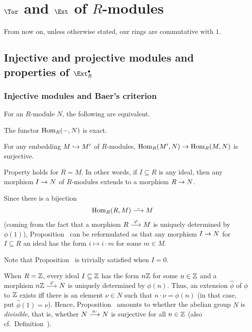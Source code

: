 \documentclass[a4paper,parskip=half,numbers=enddot, DIV=12]{scrreprt}
\begin{document}
\chapter{\texorpdfstring{$\Tor$}{Tor} and \texorpdfstring{$\Ext$}{Ext} of \texorpdfstring{$R$}{R}-modules}
From now on, unless otherwise stated, our rings are commutative with $1$.
\section{Injective and projective modules and properties of \texorpdfstring{$\Ext_R^\bullet $}{Ext}}
\subsection{Injective modules and Baer's criterion}
\begin{prop}
	For an $R$-module $N$, the following are equivalent.
	\begin{alphanumerate}
		\item The functor $\operatorname{Hom}_R(-,N)$ is exact.
		\item For any embedding $M\monomorphism M'$ of $R$-modules, $\Hom_R(M',N)\morphism\Hom_R(M,N)$ is surjective.
		\item Property  holds for $R=M$. In other words, if $I\subseteq R$ is any ideal, then any morphism $I\morphism N$ of $R$-modules extends to a morphism $R\morphism N$.
	\end{alphanumerate}
\end{prop}
\begin{rem}
	\begin{alphanumerate}
		\item {}Since there is a bijection
		\begin{align*}
			\Hom_R(R,M)&\isomorphism M
		\end{align*}
		(coming from the fact that a morphism $R\morphism[\phi]M$ is uniquely determined by $\phi(1)$), Proposition~ can be reformulated as that any morphism $I\morphism N$ for $I\subseteq R$ an ideal has the form $i\mapsto i\cdot m$ for some $m\in M$.
		\item Note that Proposition~ is trivially satisfied when $I=0$.
		\item When $R=\mathbb{Z}$, every ideal $I\subseteq \mathbb{Z}$ has the form $n\mathbb{Z}$ for some $n\in\mathbb{Z}$ and a morphism $n\IZ\morphism[\phi]N$ is uniquely determined by $\phi(n)$. Thus, an extension $\hat\phi$ of $\phi$ to $\mathbb{Z}$ exists iff there is an element $\nu\in N$ such that $n\cdot\nu=\phi(n)$ (in that case, put $\hat\phi(1)=\nu$). Hence, Proposition~  amounts to whether the abelian group $N$ is \emph{divisible}, that is, whether $N\morphism[n\cdot ]N$ is surjective for all $n\in\mathbb{Z}$ (also cf.\ Definition~\reff{def:Divisible}).
	\end{alphanumerate}
\end{rem}
\end{document}
